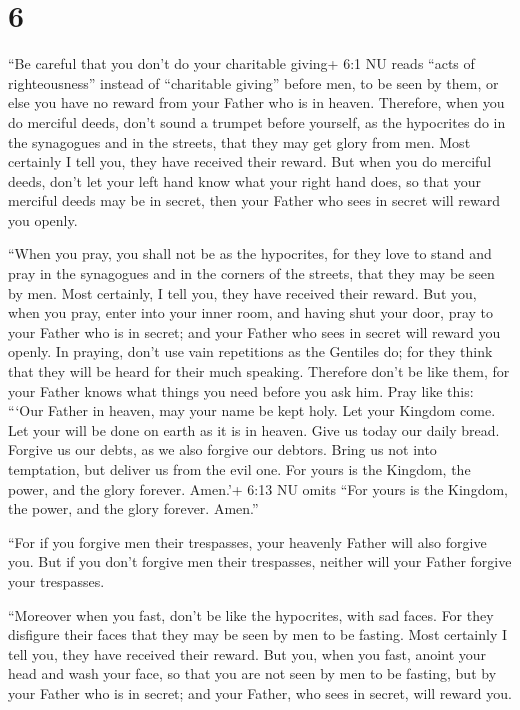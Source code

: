 \hypertarget{section-5}{%
\section{6}\label{section-5}}

 ``Be careful that you don't do your charitable giving+ 6:1
NU reads ``acts of righteousness'' instead of ``charitable giving''
before men, to be seen by them, or else you have no reward from your
Father who is in heaven.  Therefore, when you do merciful
deeds, don't sound a trumpet before yourself, as the hypocrites do in
the synagogues and in the streets, that they may get glory from men.
Most certainly I tell you, they have received their reward. 
But when you do merciful deeds, don't let your left hand know what your
right hand does,  so that your merciful deeds may be in
secret, then your Father who sees in secret will reward you openly.

 ``When you pray, you shall not be as the hypocrites, for
they love to stand and pray in the synagogues and in the corners of the
streets, that they may be seen by men. Most certainly, I tell you, they
have received their reward.  But you, when you pray, enter
into your inner room, and having shut your door, pray to your Father who
is in secret; and your Father who sees in secret will reward you openly.
 In praying, don't use vain repetitions as the Gentiles do;
for they think that they will be heard for their much speaking.
 Therefore don't be like them, for your Father knows what
things you need before you ask him.  Pray like this: ```Our
Father in heaven, may your name be kept holy.  Let your
Kingdom come. Let your will be done on earth as it is in heaven.
 Give us today our daily bread.  Forgive us
our debts, as we also forgive our debtors.  Bring us not
into temptation, but deliver us from the evil one. For yours is the
Kingdom, the power, and the glory forever. Amen.'+ 6:13 NU omits ``For
yours is the Kingdom, the power, and the glory forever. Amen.''

 ``For if you forgive men their trespasses, your heavenly
Father will also forgive you.  But if you don't forgive men
their trespasses, neither will your Father forgive your trespasses.

 ``Moreover when you fast, don't be like the hypocrites,
with sad faces. For they disfigure their faces that they may be seen by
men to be fasting. Most certainly I tell you, they have received their
reward.  But you, when you fast, anoint your head and wash
your face,  so that you are not seen by men to be fasting,
but by your Father who is in secret; and your Father, who sees in
secret, will reward you.

